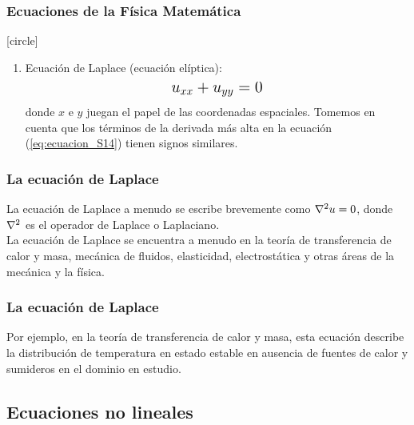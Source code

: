 \documentclass[12pt]{beamer}
\begin{document}
\begin{frame}
\frametitle{Ecuaciones de la Física Matemática}
[circle]
\begin{enumerate}[<+->]
\conti
\item Ecuación de Laplace (ecuación elíptica):
\pause
\begin{align}
\text{\Large{$u_{xx} + u_{yy} = 0$}}
\label{eq:ecuacion_S14}
\end{align}
donde $x$ e $y$ juegan el papel de las coordenadas espaciales. \pause Tomemos en cuenta que los términos de la derivada más alta en la ecuación (\ref{eq:ecuacion_S14}) tienen signos similares.
\seti
\end{enumerate}
\end{frame}
\begin{frame}
\frametitle{La ecuación de Laplace}
La ecuación de Laplace a menudo se escribe brevemente como $\laplacian{u} = 0$, donde $\laplacian$ es el operador de Laplace o Laplaciano.
\\
\bigskip
\pause
La ecuación de Laplace se encuentra a menudo en la teoría de transferencia de calor y masa, mecánica de fluidos, elasticidad, electrostática y otras áreas de la mecánica y la física.
\end{frame}
\begin{frame}
\frametitle{La ecuación de Laplace}
Por ejemplo, en la teoría de transferencia de calor y masa, esta ecuación describe la distribución de temperatura en estado estable en ausencia de fuentes de calor y sumideros en el dominio en estudio.
\end{frame}

\subsection{Ecuaciones no lineales}
\end{document}
